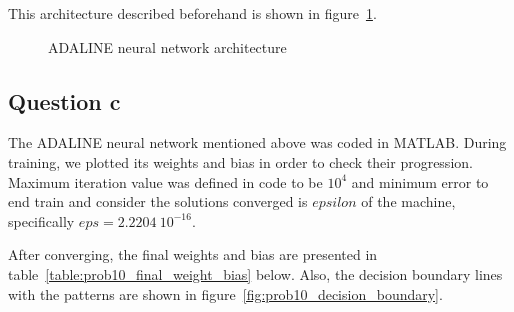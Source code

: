 This architecture described beforehand is shown in figure~\ref{fig:prob10_adaline_architecture}.
\begin{figure}[htpb]
	\centering
	
	\caption{ADALINE neural network architecture}
	\label{fig:prob10_adaline_architecture}
\end{figure}

\subsection{Question c}
The ADALINE neural network mentioned above was coded in MATLAB. During training, we plotted its weights and bias in order to check their progression. Maximum iteration value was defined in code to be $10^4$ and minimum error to end train and consider the solutions converged is $epsilon$ of the machine, specifically $eps = 2.2204\ 10^{-16}$.

After converging, the final weights and bias are presented in table~\ref{table:prob10_final_weight_bias} below. 
Also, the decision boundary lines with the patterns are shown in figure~\ref{fig:prob10_decision_boundary}.

